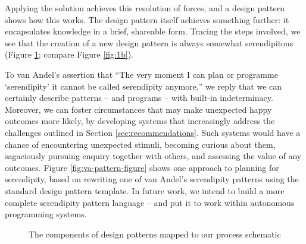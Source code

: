 %
%
Applying the solution achieves this resolution of forces, and a design
pattern shows how this works.  The design pattern itself achieves
something further: it encapsulates knowledge in a brief, shareable
form.  Tracing
the steps involved, we see that the creation of a new design pattern
is always somewhat serendipitous (Figure \ref{fig:pattern-schematic};
compare Figure \ref{fig:1b}).  

To van Andel's assertion that ``The very moment I can plan or
programme `serendipity' it cannot be called serendipity anymore,'' we
reply that we can certainly describe patterns -- and programs -- with
built-in indeterminacy.  Moreover, we can foster circumstances that
may make unexpected happy outcomes more likely, by developing systems
that increasingly address the challenges outlined in Section
\ref{sec:recommendations}.  Such systems would have a chance of encountering
unexpected stimuli, becoming curious about them, sagaciously pursuing enquiry
together with others, and assessing the value of any outcomes.  
%
Figure \ref{fig:va-pattern-figure} shows one approach to
planning for serendipity, based on rewriting one of van Andel's
serendipity patterns using the standard design pattern template.  In
future work, we intend to build a more complete serendipity pattern
language -- and put it to work within autonomous programming systems.


\begin{figure}
\vspace{.3cm}

\vspace{-.3cm}
\caption{The components of design patterns mapped to our process schematic\label{fig:pattern-schematic}}
\end{figure}

